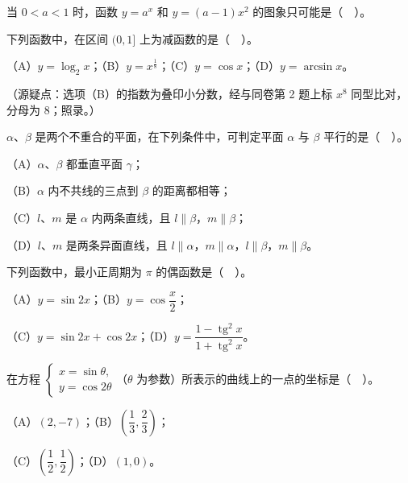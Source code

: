 \Needspace{0.4\textheight}
\begin{question}
当 $0<a<1$ 时，函数 $y=a^{x}$ 和 $y=(a-1)x^{2}$ 的图象只可能是（　）。
\nopagebreak[4]
\begin{center}\end{center}
\nopagebreak[4]
\end{question}
\begin{question}
下列函数中，在区间 $(0,1]$ 上为减函数的是（　）。

（A）$y=\log_{2}x$；（B）$y=x^{\frac{1}{8}}$；（C）$y=\cos x$；（D）$y=\arcsin x$。

（源疑点：选项（B）的指数为叠印小分数，经与同卷第 2 题上标 $x^8$ 同型比对，分母为 $8$；照录。）

\end{question}
\begin{question}
$\alpha$、$\beta$ 是两个不重合的平面，在下列条件中，可判定平面 $\alpha$ 与 $\beta$ 平行的是（　）。

（A）$\alpha$、$\beta$ 都垂直平面 $\gamma$；

（B）$\alpha$ 内不共线的三点到 $\beta$ 的距离都相等；

（C）$l$、$m$ 是 $\alpha$ 内两条直线，且 $l\parallel\beta$，$m\parallel\beta$；

（D）$l$、$m$ 是两条异面直线，且 $l\parallel\alpha$，$m\parallel\alpha$，$l\parallel\beta$，$m\parallel\beta$。

\end{question}
\begin{question}
下列函数中，最小正周期为 $\pi$ 的偶函数是（　）。

（A）$y=\sin 2x$；（B）$y=\cos\dfrac{x}{2}$；

（C）$y=\sin 2x+\cos 2x$；（D）$y=\dfrac{1-\operatorname{tg}^{2}x}{1+\operatorname{tg}^{2}x}$。

\end{question}
\begin{question}
在方程 $\begin{cases}x=\sin\theta,\\ y=\cos 2\theta\end{cases}$（$\theta$ 为参数）所表示的曲线上的一点的坐标是（　）。

（A）$(2,-7)$；（B）$\left(\dfrac{1}{3},\dfrac{2}{3}\right)$；

（C）$\left(\dfrac{1}{2},\dfrac{1}{2}\right)$；（D）$(1,0)$。

\end{question}
